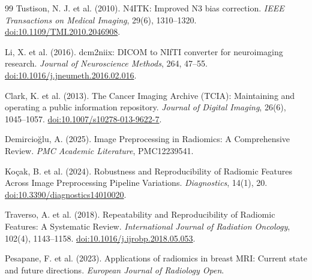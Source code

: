 \documentclass[12pt,a4paper]{report}
\begin{document}
\begin{thebibliography}{99}
        Tustison, N. J. et al. (2010).
        \newblock N4ITK: Improved N3 bias correction.
        \newblock \emph{IEEE Transactions on Medical Imaging}, 29(6), 1310–1320. \href{https://doi.org/10.1109/TMI.2010.2046908}{doi:10.1109/TMI.2010.2046908}.

        Li, X. et al. (2016).
        \newblock dcm2niix: DICOM to NIfTI converter for neuroimaging research.
        \newblock \emph{Journal of Neuroscience Methods}, 264, 47–55. \href{https://doi.org/10.1016/j.jneumeth.2016.02.016}{doi:10.1016/j.jneumeth.2016.02.016}.

        Clark, K. et al. (2013).
        \newblock The Cancer Imaging Archive (TCIA): Maintaining and operating a public information repository.
        \newblock \emph{Journal of Digital Imaging}, 26(6), 1045–1057. \href{https://doi.org/10.1007/s10278-013-9622-7}{doi:10.1007/s10278-013-9622-7}.

        Demircioğlu, A. (2025).
        \newblock Image Preprocessing in Radiomics: A Comprehensive Review.
        \newblock \emph{PMC Academic Literature}, PMC12239541.

        Koçak, B. et al. (2024).
        \newblock Robustness and Reproducibility of Radiomic Features Across Image Preprocessing Pipeline Variations.
        \newblock \emph{Diagnostics}, 14(1), 20. \href{https://doi.org/10.3390/diagnostics14010020}{doi:10.3390/diagnostics14010020}.

        Traverso, A. et al. (2018).
        \newblock Repeatability and Reproducibility of Radiomic Features: A Systematic Review.
        \newblock \emph{International Journal of Radiation Oncology}, 102(4), 1143–1158. \href{https://doi.org/10.1016/j.ijrobp.2018.05.053}{doi:10.1016/j.ijrobp.2018.05.053}.

        Pesapane, F. et al. (2023).
        \newblock Applications of radiomics in breast MRI: Current state and future directions.
        \newblock \emph{European Journal of Radiology Open}.
    \end{thebibliography}

    \clearpage
    \setcounter{tocdepth}{2}
    \renewcommand{\contentsname}{Table des matières}
    \tableofcontents
\end{document}
